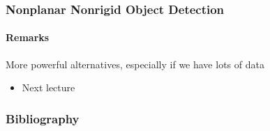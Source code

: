 \documentclass[xetex,professionalfont]{beamer}
\let\oldemph\emph
\renewcommand\emph[1]{\textcolor{tuwcvl_inf_red}{#1}}
\begin{document}

\begin{frame}
\frametitle{Nonplanar Nonrigid Object Detection}
\framesubtitle{Remarks}

More powerful alternatives, especially if we have lots of data
\begin{itemize}
    \item Next lecture
\end{itemize}

\end{frame}


\renewcommand\emph[1]{\oldemph{#1}}

\begin{frame}[allowframebreaks=0.9]
\frametitle{Bibliography}

\printbibliography

\end{frame}
\end{document}
